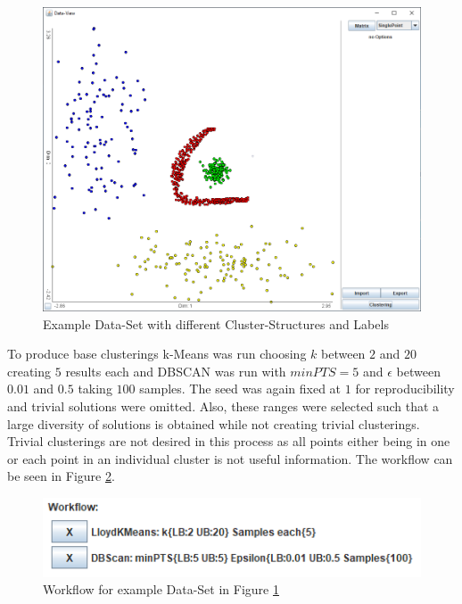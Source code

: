 \documentclass[
	a4paper,
	english,
	twoside,
	openright,               
	11pt                            
	]{report}
\begin{document}
\begin{figure}[h]
	\centering
	\includegraphics[scale=.4]{unob}
	\caption{Example Data-Set with different Cluster-Structures and Labels}
	\label{fig:unob}
\end{figure}

To produce base clusterings k-Means was run choosing $k$ between $2$ and $20$ creating $5$ results each and DBSCAN was run with $minPTS=5$ and $\epsilon$ between $0.01$ and $0.5$ taking $100$ samples. The seed was again fixed at $1$  for reproducibility and trivial solutions were omitted. Also, these ranges were selected such that a large diversity of solutions is obtained while not creating trivial clusterings. Trivial clusterings are not desired in this process as all points either being in one or each point in an individual cluster is not useful information. The workflow can be seen in Figure \ref{fig:unob_wf}.

\begin{figure}[h]
	\centering
	\includegraphics[scale=.75]{unob_wf}
	\caption{Workflow for example Data-Set in Figure \ref{fig:unob}}
	\label{fig:unob_wf}
\end{figure}
\end{document}
